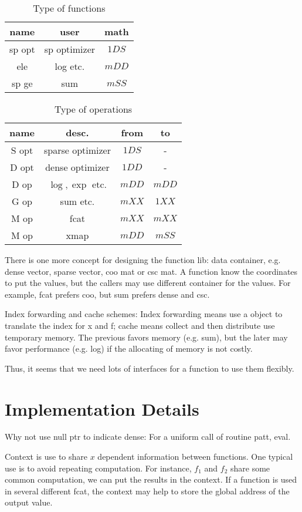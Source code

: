 \documentclass[9pt,twocolumn]{extarticle}
\begin{document}
\begin{table}
  \centering
  \begin{tabular}{|c|cc|}
    \hline
    name&user&math\\\hline
    sp opt&sp optimizer&$1DS$\\
    ele&log etc.&$mDD$\\
    sp ge&sum&$mSS$\\
  \end{tabular}
  \caption{Type of functions}
\end{table}

\begin{table}
  \centering
  \begin{tabular}{|c|ccc|}
    \hline
    name&desc.&from&to\\\hline
    S opt&sparse optimizer&$1DS$&-\\
    D opt&dense optimizer&$1DD$&-\\
    D op&$\log, \exp$ etc.&$mDD$&$mDD$\\
    G op&sum etc.&$mXX$&$1XX$\\
    M op&fcat&$mXX$&$mXX$\\
    M op&xmap&$mDD$&$mSS$\\
    \hline
  \end{tabular}
  \caption{Type of operations}
\end{table}

There is one more concept for designing the function lib: data
container, e.g. dense vector, sparse vector, coo mat or csc mat.  A
function know the coordinates to put the values, but the callers may
use different container for the values.  For example, fcat prefers
coo, but sum prefers dense and csc.

Index forwarding and cache schemes: Index forwarding means use a
object to translate the index for x and f; cache means collect and
then distribute use temporary memory.  The previous favors memory
(e.g. sum), but the later may favor performance (e.g. log) if the
allocating of memory is not costly.

Thus, it seems that we need lots of interfaces for a function to use
them flexibly.

\section{Implementation Details}
Why not use null ptr to indicate dense: For a uniform call of routine
patt, eval.

Context is use to share $x$ dependent information between functions.
One typical use is to avoid repeating computation.  For instance,
$f_1$ and $f_2$ share some common computation, we can put the results
in the context.  If a function is used in several different fcat, the
context may help to store the global address of the output value.
\end{document}
